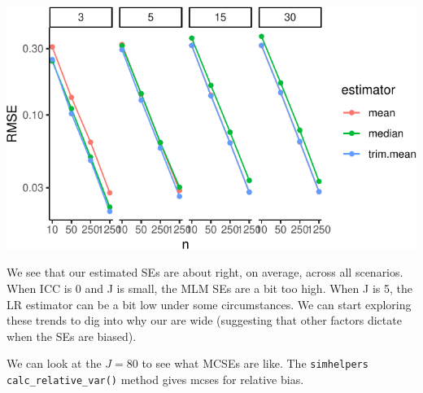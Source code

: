 \documentclass[
]{book}
\begin{document}
\begin{center}\includegraphics[width=0.75\linewidth]{Designing-Simulations-in-R_files/figure-latex/unnamed-chunk-185-1} \end{center}

We see that our estimated SEs are about right, on average, across all scenarios.
When ICC is 0 and J is small, the MLM SEs are a bit too high.
When J is 5, the LR estimator can be a bit low under some circumstances.
We can start exploring these trends to dig into why our are wide (suggesting that other factors dictate when the SEs are biased).

We can look at the \(J = 80\) to see what MCSEs are like.
The \texttt{simhelpers} \texttt{calc\_relative\_var()} method gives mcses for relative bias.
\end{document}
